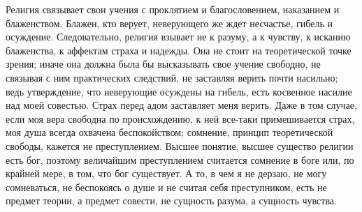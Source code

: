 \documentclass[12pt,oneside]{book}
\begin{document}



Религия связывает свои учения с проклятием и благословением, наказанием и блаженством. Блажен, кто верует, неверующего же ждет несчастье, гибель и осуждение. Следовательно, религия взывает не к разуму, а к чувству, к исканию блаженства, к аффектам страха и надежды. Она не стоит на теоретической точке зрения; иначе она должна была бы высказывать свое учение свободно, не связывая с ним практических следствий, не заставляя верить почти насильно; ведь утверждение, что неверующие осуждены на гибель, есть косвенное насилие над моей совестью. Страх перед адом заставляет меня верить. Даже в том случае, если моя вера свободна по происхождению, к ней все-таки примешивается страх, моя душа всегда охвачена беспокойством; сомнение, принцип теоретической свободы, кажется не преступлением. Высшее понятие, высшее существо религии есть бог, поэтому величайшим преступлением считается сомнение в боге или, по крайней мере, в том, что бог существует. А то, в чем я не дерзаю, не могу сомневаться, не беспокоясь о душе и не считая себя преступником, есть не предмет теории, а предмет совести, не сущность разума, а сущность чувства.
\end{document}
